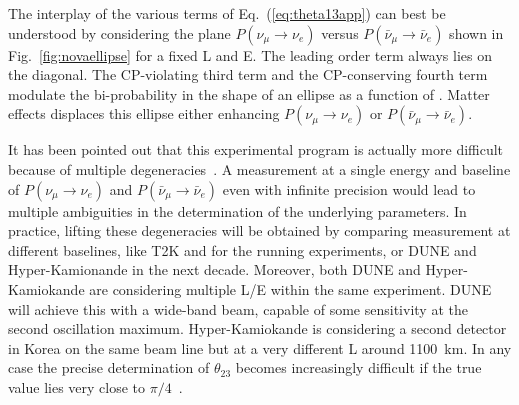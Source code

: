 The interplay of the various terms of Eq.~(\ref{eq:theta13app}) can best be understood by considering the plane $ P (\nu_\mu \rightarrow \nu_e)$ versus  $ P (\bar{\nu}_\mu \rightarrow \bar{\nu}_e)$ shown in Fig.~\ref{fig:novaellipse} for a fixed L and E. The leading order term always lies on the diagonal. The CP-violating third term and the CP-conserving fourth term modulate the bi-probability in the shape of an ellipse as a function of \dcp.
Matter effects displaces this ellipse either enhancing $ P (\nu_\mu \rightarrow \nu_e)$ or 
$ P (\bar{\nu}_\mu \rightarrow \bar{\nu}_e)$.

It has been pointed out that this experimental program is actually more difficult because of multiple degeneracies~\cite{burguet,parkedeg}. A measurement at a single energy and baseline of $ P (\nu_\mu \rightarrow \nu_e)$ and  $ P (\bar{\nu}_\mu \rightarrow \bar{\nu}_e)$ even with infinite precision  would lead to multiple ambiguities in the determination of the underlying parameters. In practice, lifting these degeneracies will be obtained by comparing measurement at different baselines, like T2K and \nova for the running experiments, or DUNE and Hyper-Kamionande in the next decade. Moreover, both DUNE and Hyper-Kamiokande are considering multiple L/E within the same experiment. DUNE will achieve this with a wide-band beam, capable of some sensitivity at the second oscillation maximum. Hyper-Kamiokande is considering a second detector in Korea on the same beam line but at a very different L around 1100~km. In any case the precise determination of $\theta_{23}$ becomes increasingly difficult if the true value lies very close to $\pi/4$~\cite{parkedeg}. 




